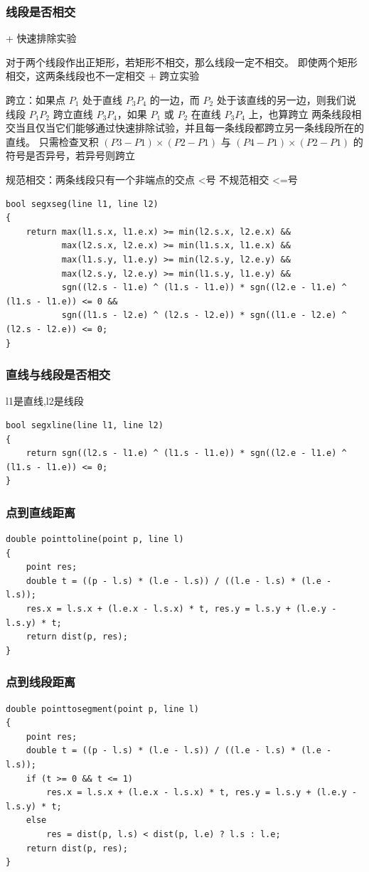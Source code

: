 \documentclass[twoside]{article}
\begin{document}
\subsubsection{线段是否相交}
+ 快速排除实验

对于两个线段作出正矩形，若矩形不相交，那么线段一定不相交。
即使两个矩形相交，这两条线段也不一定相交
+ 跨立实验

跨立：如果点 $P_1$ 处于直线 $P_3P_4$ 的一边，而 $P_2$ 处于该直线的另一边，则我们说线段 $P_1P_2$ 跨立直线 $P_3P_4$，如果 $P_1$ 或 $P_2$ 在直线 $P_3P_4$ 上，也算跨立
两条线段相交当且仅当它们能够通过快速排除试验，并且每一条线段都跨立另一条线段所在的直线。
只需检查叉积 $(P3-P1)\times(P2-P1)$ 与 $(P4-P1)\times(P2-P1)$ 的符号是否异号，若异号则跨立

规范相交：两条线段只有一个非端点的交点 <号
不规范相交 <=号

\begin{lstlisting}
bool segxseg(line l1, line l2)
{
    return max(l1.s.x, l1.e.x) >= min(l2.s.x, l2.e.x) &&
           max(l2.s.x, l2.e.x) >= min(l1.s.x, l1.e.x) &&
           max(l1.s.y, l1.e.y) >= min(l2.s.y, l2.e.y) &&
           max(l2.s.y, l2.e.y) >= min(l1.s.y, l1.e.y) &&
           sgn((l2.s - l1.e) ^ (l1.s - l1.e)) * sgn((l2.e - l1.e) ^ (l1.s - l1.e)) <= 0 &&
           sgn((l1.s - l2.e) ^ (l2.s - l2.e)) * sgn((l1.e - l2.e) ^ (l2.s - l2.e)) <= 0;
}
\end{lstlisting}
\subsubsection{直线与线段是否相交}
l1是直线,l2是线段
\begin{lstlisting}
bool segxline(line l1, line l2)
{
    return sgn((l2.s - l1.e) ^ (l1.s - l1.e)) * sgn((l2.e - l1.e) ^ (l1.s - l1.e)) <= 0;
}
\end{lstlisting}
\subsubsection{点到直线距离}
\begin{lstlisting}
double pointtoline(point p, line l)
{
    point res;
    double t = ((p - l.s) * (l.e - l.s)) / ((l.e - l.s) * (l.e - l.s));
    res.x = l.s.x + (l.e.x - l.s.x) * t, res.y = l.s.y + (l.e.y - l.s.y) * t;
    return dist(p, res);
}
\end{lstlisting}
\subsubsection{点到线段距离}
\begin{lstlisting}
double pointtosegment(point p, line l)
{
    point res;
    double t = ((p - l.s) * (l.e - l.s)) / ((l.e - l.s) * (l.e - l.s));
    if (t >= 0 && t <= 1)
        res.x = l.s.x + (l.e.x - l.s.x) * t, res.y = l.s.y + (l.e.y - l.s.y) * t;
    else
        res = dist(p, l.s) < dist(p, l.e) ? l.s : l.e;
    return dist(p, res);
}
\end{lstlisting}
\end{document}

